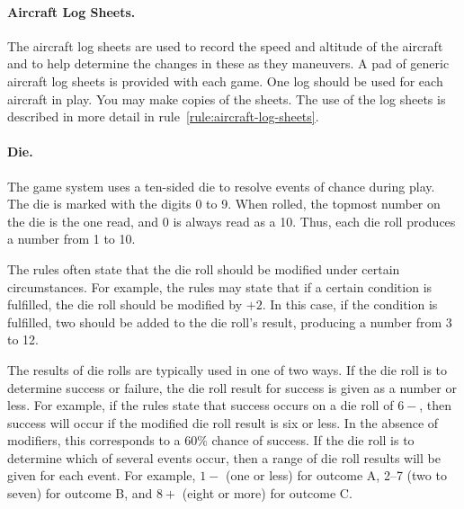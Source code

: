 {\paragraph{Aircraft Log Sheets.} The aircraft log sheets are used to record the speed and altitude of the aircraft and to help determine the changes in these as they maneuvers. A pad of generic aircraft log sheets is provided with each game. One log should be used for each aircraft in play. You may make copies of the sheets. The use of the log sheets is described in more detail in rule~\ref{rule:aircraft-log-sheets}.

\paragraph{Die.} The game system uses a ten-sided die to resolve events of chance during play. The die is marked with the digits 0 to 9. When rolled, the topmost number on the die is the one read, and 0 is always read as a 10. Thus, each die roll produces a number from 1 to 10.

The rules often state that the die roll should be modified under certain circumstances. For example, the rules may state that if a certain condition is fulfilled, the die roll should be modified by $+2$. In this case, if the condition is fulfilled, two should be added to the die roll's result, producing a number from 3 to 12.

The results of die rolls are typically used in one of two ways. If the die roll is to determine success or failure, the die roll result for success is given as a number or less. For example, if the rules state that success occurs on a die roll of $6-$, then success will occur if the modified die roll result is six or less. In the absence of modifiers, this corresponds to a 60\% chance of success. If the die roll is to determine which of several events occur, then a range of die roll results will be given for each event. For example, $1-$ (one or less) for outcome A, 2--7 (two to seven) for outcome B, and $8+$ (eight or more) for outcome C.


}




